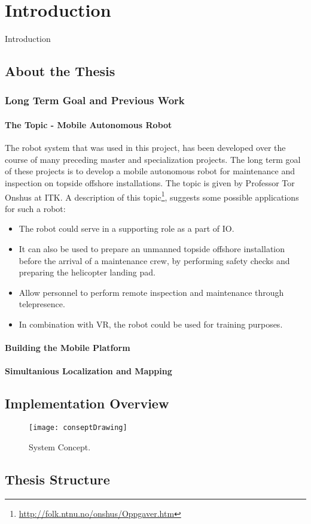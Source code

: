 \chapter{Introduction}
\label{chp:introduction} 

Introduction
\section{About the Thesis}

\subsection{Long Term Goal and Previous Work}

\subsubsection{The Topic - Mobile Autonomous Robot}

The robot system that was used in this project, has been developed over the course of many preceding master and specialization projects. The long term goal of these projects is to develop a mobile autonomous robot for maintenance and inspection on topside offshore installations. The topic is given by Professor Tor Onshus at \ac{ITK}. A description of this topic\footnote{\url{http://folk.ntnu.no/onshus/Oppgaver.htm}}, suggests some possible applications for such a robot: 

\begin{itemize}
	\item The robot could serve in a supporting role as a part of \ac{IO}.
	\item It can also be used to prepare an unmanned topside offshore installation before the arrival of a maintenance crew, by performing safety checks and preparing the helicopter landing pad.  
	\item Allow personnel to perform remote inspection and maintenance through telepresence.
	\item  In combination with \ac{VR}, the robot could be used for training purposes. 
\end{itemize}



\subsubsection{Building the Mobile Platform}

\subsubsection{Simultanious Localization and Mapping}

\section{Implementation Overview}

\begin{figure}[p]
	\centering
	\texttt{[image: conseptDrawing]}
	\caption{System Concept. }
	\label{fig:conseptDrawing}
\end{figure}

\section{Thesis Structure}